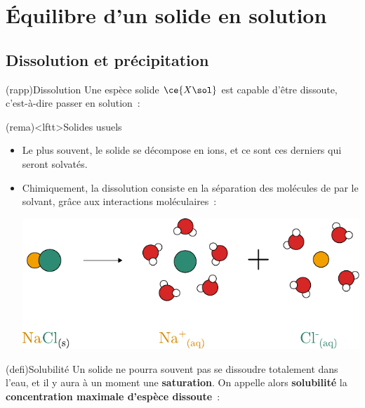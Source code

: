 \documentclass[../../main/main.tex]{subfiles}
\begin{document}
\section{Équilibre d'un solide en solution}

\subsection{Dissolution et précipitation}
\begin{tcb*}(rapp){Dissolution}
	Une espèce solide $\ce{X\sol}$ est capable d'être dissoute, c'est-à-dire passer
	en solution~:
	\psw{
		\[
			\ce{A_pB_q\sol{}} = p \ce{A+}\aqu{} + q \ce{B-}\aqu
		\]
	}
	\vspace{-15pt}
\end{tcb*}

\begin{tcb*}(rema)<lftt>{Solides usuels}
	\begin{itemize}
		\item Le plus souvent, le solide se décompose en ions, et ce sont ces
		      derniers qui seront solvatés.
		\item Chimiquement, la dissolution consiste en la séparation des molécules
		      de  par le solvant, grâce aux interactions moléculaires~:
		      \begin{center}
			      \includegraphics[scale=.8]{dissolution}
		      \end{center}
	\end{itemize}
\end{tcb*}

\begin{tcb*}[sidebyside, righthand ratio=.3](defi){Solubilité}
	Un solide ne pourra souvent pas se dissoudre totalement dans l'eau, et il y
	aura à un moment une \textbf{saturation}. On appelle alors \textbf{solubilité}
	la \textbf{concentration maximale d'espèce dissoute}~:
	\psw{
		\[
			\boxed{s = \frac{n\ind{dis,max}}{V}}
		\]
	}
	\vspace{-15pt}
	\tcblower
	\psw{
		\[
			\si{mol.L^{-1}}
		\]
	}
\end{tcb*}
\end{document}
